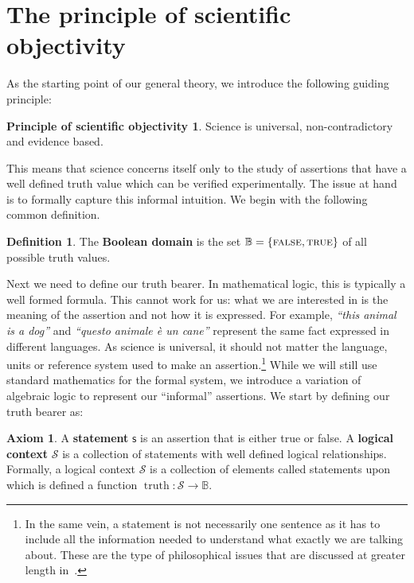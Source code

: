 \documentclass[%
reprint,
amsmath,amssymb,
aps,
prx,
]{revtex4-1}
\theoremstyle{plain}%
\theoremstyle{definition}
\newtheorem{defn}[thrm]{Definition}
\newtheorem{axiom}[thrm]{Axiom}
\newtheorem*{principle*}{Principle of scientific objectivity}
\theoremstyle{remark}
\DeclareMathOperator{\truth}{truth}
\def\Bool{\mathbb{B}}
\def\TRUE{\textsc{true}}
\def\FALSE{\textsc{false}}
\newcommand{\stmt}[1][s] {\mathsf{#1}}
\def\logCtx{\mathcal{S}}
\newcommand{\statement}[1] {\emph{``#1''}}
\begin{document}
\section{The principle of scientific objectivity}

As the starting point of our general theory, we introduce the following guiding principle:

\begin{principle*}
Science is universal, non-contradictory and evidence based.
\end{principle*}

This means that science concerns itself only to the study of assertions that have a well defined truth value which can be verified experimentally. The issue at hand is to formally capture this informal intuition. We begin with the following common definition.

\begin{defn}
	The \textbf{Boolean domain} is the set $\mathbb{B} = \{\FALSE, \TRUE\}$ of all possible truth values.
\end{defn}

Next we need to define our truth bearer. In mathematical logic, this is typically a well formed formula. This cannot work for us: what we are interested in is the meaning of the assertion and not how it is expressed. For example, \statement{this animal is a dog} and \statement{questo animale \`e un cane} represent the same fact expressed in different languages. As science is universal, it should not matter the language, units or reference system used to make an assertion.\footnote{In the same vein, a statement is not necessarily one sentence as it has to include all the information needed to understand what exactly we are talking about. These are the type of philosophical issues that are discussed at greater length in~\cite{Carc3}.} While we will still use standard mathematics for the formal system, we introduce a variation of algebraic logic to represent our ``informal'' assertions. We start by defining our truth bearer as:

\begin{axiom}\label{ax_statement}
	A \textbf{statement} $\stmt$ is an assertion that is either true or false. A \textbf{logical context} $\logCtx$ is a collection of statements with well defined logical relationships. Formally, a logical context $\logCtx$ is a collection of elements called statements upon which is defined a function $\truth: \logCtx \to \Bool$.
\end{axiom}
\end{document}
